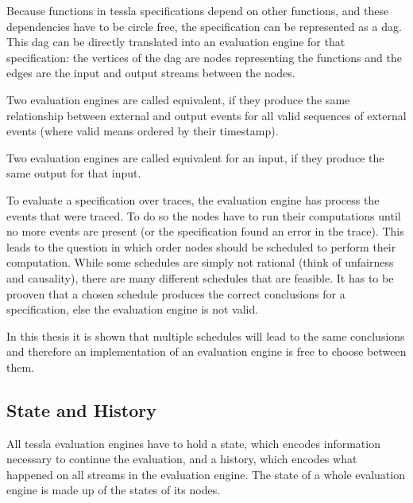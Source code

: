Because functions in \gls{tessla} specifications depend on other functions, and these dependencies have to be circle free,
the specification can be represented as a \gls{dag}.
This \gls{dag} can be directly translated into an evaluation engine for that specification: the vertices of the \gls{dag} are nodes representing the functions and the edges are the input and output streams between the nodes.

\begin{definition}[name=Equivalence of Evaluation Engines]\label{def:equivalence_eval_engine}
  Two evaluation engines are called equivalent, if they produce the same relationship between external and output events for all valid sequences of external events (where valid means ordered by their timestamp).
\end{definition}

\begin{definition}[name=Equivalence of Evaluation Engines for an Input]\label{def:equivalence_eval_engine_specific}
  Two evaluation engines are called equivalent for an input, if they produce the same output for that input.
\end{definition}

To evaluate a specification over traces, the evaluation engine has process the events that were traced.
To do so the nodes have to run their computations until no more events are present (or the specification found an error in the trace).
This leads to the question in which order nodes should be scheduled to perform their computation.
While some schedules are simply not rational (think of unfairness and causality), there are many different schedules that are feasible.
It has to be prooven that a chosen schedule produces the correct conclusions for a specification, else the evaluation engine is not valid.

In this thesis it is shown that multiple schedules will lead to the same conclusions and therefore an implementation of an evaluation engine is free to choose between them.

\subsection{State and History}
\label{sec:concepts:def:state}

All \gls{tessla} evaluation engines have to hold a state, which encodes information necessary to continue the evaluation, and a history, which encodes what happened on all streams in the evaluation engine.
The state of a whole evaluation engine is made up of the states of its nodes.


